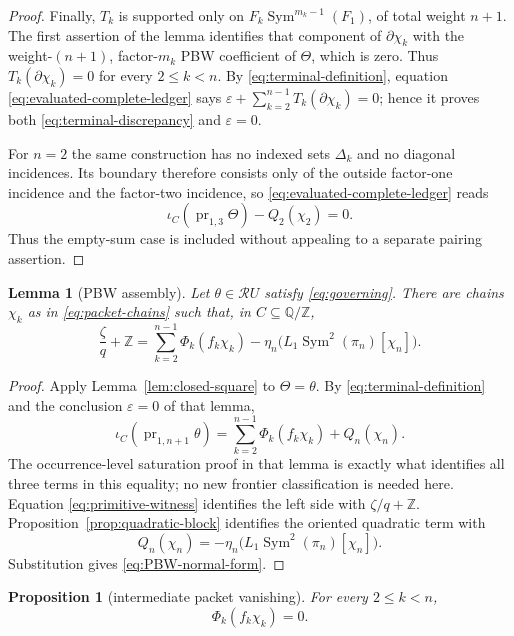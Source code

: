 \documentclass[11pt]{amsart}
\newtheorem{proposition}[theorem]{Proposition}
\newtheorem{lemma}[theorem]{Lemma}
\theoremstyle{remark}
\newcommand{\Z}{\mathbb Z}
\newcommand{\Q}{\mathbb Q}
\newcommand{\Sym}{\operatorname{Sym}}
\newcommand{\Rel}{\mathcal R}
\newcommand{\pr}{\operatorname{pr}}
\begin{document}
\begin{proof}
	Finally, $T_k$ is supported only on
	$F_k\Sym^{m_k-1}(F_1)$, of total weight $n+1$.  The first assertion of
	the lemma identifies that component of $\partial\chi_k$ with the
	weight-$(n+1)$, factor-$m_k$ PBW coefficient of $\Theta$, which is zero.
	Thus $T_k(\partial\chi_k)=0$ for every $2\leq k<n$.  By
	\eqref{eq:terminal-definition}, equation
	\eqref{eq:evaluated-complete-ledger} says
	$\varepsilon+\sum_{k=2}^{n-1}T_k(\partial\chi_k)=0$; hence it proves both
	\eqref{eq:terminal-discrepancy} and $\varepsilon=0$.

	For $n=2$ the same construction has no indexed sets $\Delta_k$ and no
	diagonal incidences.  Its boundary therefore consists only of the
	outside factor-one incidence and the factor-two incidence, so
	\eqref{eq:evaluated-complete-ledger} reads
	\[
	 \iota_C(\pr_{1,3}\Theta)-Q_2(\chi_2)=0.
	\]
	Thus the empty-sum case is included without appealing to a separate
	pairing assertion.
	\end{proof}

\begin{lemma}[PBW assembly]\label{lem:PBW-assembly}
Let $\theta\in\Rel U$ satisfy \eqref{eq:governing}.  There are chains
$\chi_k$ as in \eqref{eq:packet-chains} such that, in
$C\subseteq\Q/\Z$,
\begin{equation}\label{eq:PBW-normal-form}
 \frac{\zeta}{q}+\Z
 =\sum_{k=2}^{n-1}\Phi_k(f_k\chi_k)
 -\eta_n\bigl(L_1\Sym^2(\pi_n)[\chi_n]\bigr).
\end{equation}
\end{lemma}

\begin{proof}
Apply Lemma~\ref{lem:closed-square} to $\Theta=\theta$.  By
\eqref{eq:terminal-definition} and the conclusion $\varepsilon=0$ of
that lemma,
\[
 \iota_C(\pr_{1,n+1}\theta)
 =\sum_{k=2}^{n-1}\Phi_k(f_k\chi_k)+Q_n(\chi_n).
\]
The occurrence-level saturation proof in that lemma is exactly what
identifies all three terms in this equality; no new frontier
classification is needed here.  Equation \eqref{eq:primitive-witness}
identifies the left side with $\zeta/q+\Z$.
Proposition~\ref{prop:quadratic-block} identifies the oriented quadratic term with
\[
 Q_n(\chi_n)
 =-\eta_n\bigl(L_1\Sym^2(\pi_n)[\chi_n]\bigr).
\]
Substitution gives \eqref{eq:PBW-normal-form}.
\end{proof}

\begin{proposition}[intermediate packet vanishing]
\label{prop:intermediate-vanishing}
For every $2\leq k<n$,
\[
                         \Phi_k(f_k\chi_k)=0.
\]
\end{proposition}
\end{document}
